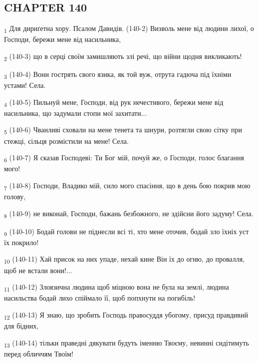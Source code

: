 \subsection{CHAPTER 140}
\begin{tcolorbox}
\textsubscript{1} Для дириґетна хору. Псалом Давидів. (140-2) Визволь мене від людини лихої, о Господи, бережи мене від насильника,
\end{tcolorbox}
\begin{tcolorbox}
\textsubscript{2} (140-3) що в серці своїм замишляють злі речі, що війни щодня викликають!
\end{tcolorbox}
\begin{tcolorbox}
\textsubscript{3} (140-4) Вони гострять свого язика, як той вуж, отрута гадюча під їхніми устами! Села.
\end{tcolorbox}
\begin{tcolorbox}
\textsubscript{4} (140-5) Пильнуй мене, Господи, від рук нечестивого, бережи мене від насильника, що задумали стопи мої захитати...
\end{tcolorbox}
\begin{tcolorbox}
\textsubscript{5} (140-6) Чванливі сховали на мене тенета та шнури, розтягли свою сітку при стежці, сільця розмістили на мене! Села.
\end{tcolorbox}
\begin{tcolorbox}
\textsubscript{6} (140-7) Я сказав Господеві: Ти Бог мій, почуй же, о Господи, голос благання мого!
\end{tcolorbox}
\begin{tcolorbox}
\textsubscript{7} (140-8) Господи, Владико мій, сило мого спасіння, що в день бою покрив мою голову,
\end{tcolorbox}
\begin{tcolorbox}
\textsubscript{8} (140-9) не виконай, Господи, бажань безбожного, не здійсни його задуму! Села.
\end{tcolorbox}
\begin{tcolorbox}
\textsubscript{9} (140-10) Бодай голови не піднесли всі ті, хто мене оточив, бодай зло їхніх уст їх покрило!
\end{tcolorbox}
\begin{tcolorbox}
\textsubscript{10} (140-11) Хай присок на них упаде, нехай кине Він їх до огню, до провалля, щоб не встали вони!...
\end{tcolorbox}
\begin{tcolorbox}
\textsubscript{11} (140-12) Злоязична людина щоб міцною вона не була на землі, людина насильства бодай лихо спіймало її, щоб попхнути на погибіль!
\end{tcolorbox}
\begin{tcolorbox}
\textsubscript{12} (140-13) Я знаю, що зробить Господь правосуддя убогому, присуд правдивий для бідних,
\end{tcolorbox}
\begin{tcolorbox}
\textsubscript{13} (140-14) тільки праведні дякувати будуть іменню Твоєму, невинні сидітимуть перед обличчям Твоїм!
\end{tcolorbox}

